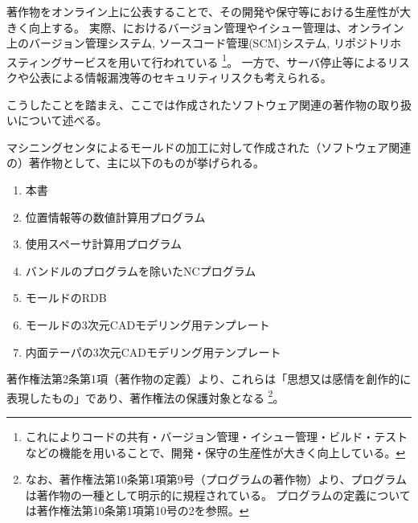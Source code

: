 

著作物をオンライン上に公表することで、その開発や保守等における生産性が大きく向上する。
実際、\DMname におけるバージョン管理やイシュー管理は、オンライン上のバージョン管理システム, ソースコード管理(SCM)システム, リポジトリホスティングサービスを用いて行われている
\footnote{これによりコードの共有・バージョン管理・イシュー管理・ビルド・テストなどの機能を用いることで、開発・保守の生産性が大きく向上している。}。
一方で、サーバ停止等によるリスクや公表による情報漏洩等のセキュリティリスクも考えられる。

こうしたことを踏まえ、ここでは作成されたソフトウェア関連の著作物の取り扱いについて述べる。



マシニングセンタによるモールドの加工に対して作成された（ソフトウェア関連の）著作物として、主に以下のものが挙げられる。
\begin{enumerate}
\item 本書
\item 位置情報等の数値計算用プログラム
\item 使用スペーサ計算用プログラム
\item バンドルのプログラムを除いたNCプログラム
\item モールドのRDB
\item モールドの3次元CADモデリング用テンプレート
\item 内面テーパの3次元CADモデリング用テンプレート
\end{enumerate}
著作権法第2条第1項（著作物の定義）より、これらは「思想又は感情を創作的に表現したもの」であり、著作権法の保護対象となる
\footnote{なお、著作権法第10条第1項第9号（プログラムの著作物）より、プログラムは著作物の一種として明示的に規程されている。
プログラムの定義については著作権法第10条第1項第10号の2を参照。}。





